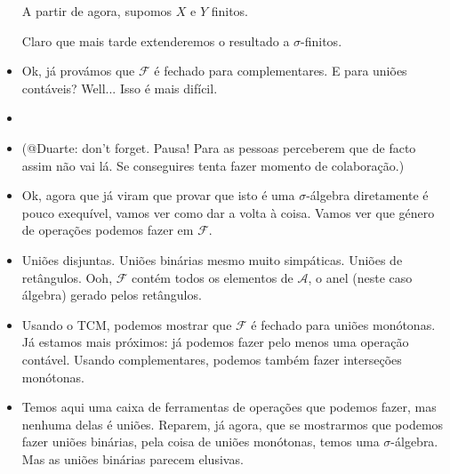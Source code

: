 \documentclass{article}
\renewcommand{\cal}[1]{\mathcal{#1}}
\begin{document}
\begin{itemize}
\begin{center}
A partir de agora, supomos $X$ e $Y$ finitos.
\end{center}
Claro que mais tarde extenderemos o resultado a $\sigma$-finitos.
\item Ok, já provámos que $\cal F$ é fechado para complementares. E para uniões contáveis? Well... Isso é mais difícil.
\item{}
\item (@Duarte: don't forget. Pausa! Para as pessoas perceberem que de facto assim não vai lá. Se conseguires tenta fazer momento de colaboração.)
\item Ok, agora que já viram que provar que isto é uma $\sigma$-álgebra diretamente é pouco exequível, vamos ver como dar a volta à coisa. Vamos ver que género de operações podemos fazer em $\cal F$.
\item Uniões disjuntas. Uniões binárias mesmo muito simpáticas. Uniões de retângulos. Ooh, $\cal F$ contém todos os elementos de $\cal A$, o anel (neste caso álgebra) gerado pelos retângulos.
\item Usando o TCM, podemos mostrar que $\cal F$ é fechado para uniões monótonas. Já estamos mais próximos: já podemos fazer pelo menos uma operação contável. Usando complementares, podemos também fazer interseções monótonas.
\item Temos aqui uma caixa de ferramentas de operações que podemos fazer, mas nenhuma delas é uniões. Reparem, já agora, que se mostrarmos que podemos fazer uniões binárias, pela coisa de uniões monótonas, temos uma $\sigma$-álgebra. Mas as uniões binárias parecem elusivas.
\end{itemize}
\end{document}
